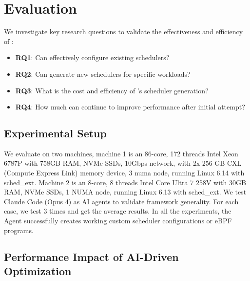 \section{Evaluation}
\label{sec:evaluation}


We investigate key research questions to validate the effectiveness and efficiency of \sys:

\begin{itemize}
\item \textbf{RQ1}: Can \sys effectively configure existing schedulers?
\item \textbf{RQ2}: Can \sys generate new schedulers for specific workloads?
\item \textbf{RQ3}: What is the cost and efficiency of \sys's scheduler generation?
\item \textbf{RQ4}: How much can \agent continue to improve performance after initial attempt?
\end{itemize}

\subsection{Experimental Setup}

We evaluate \sys on two machines, machine 1 is an 86-core, 172 threads Intel Xeon 6787P with 758GB RAM, NVMe SSDs, 10Gbps network, with 2x 256 GB CXL (Compute Express Link) memory device, 3 numa node, running Linux 6.14 with sched\_ext. Machine 2 is an 8-core, 8 threads Intel Core Ultra 7 258V with 30GB RAM, NVMe SSDs, 1 NUMA node, running Linux 6.13 with sched\_ext. We test Claude Code (Opus 4) as AI agents to validate framework generality. For each case, we test 3 times and get the average results. In all the experiments, the Agent successfully creates working custom scheduler configurations or eBPF programs.

\subsection{Performance Impact of AI-Driven Optimization}


